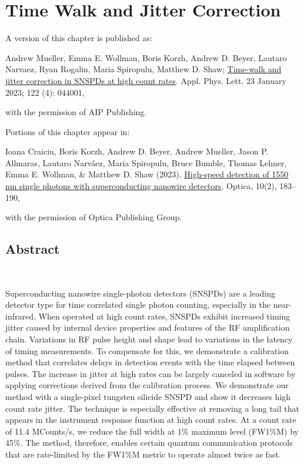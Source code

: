 \documentclass[11pt]{caltech_thesis} %
\begin{document}
\hypertarget{time-walk-and-jitter-correction}{%
\chapter{Time Walk and Jitter Correction}\label{time-walk-and-jitter-correction}}

A version of this chapter is published as:

Andrew Mueller, Emma E. Wollman, Boris Korzh, Andrew D. Beyer, Lautaro Narvaez, Ryan Rogalin, Maria Spiropulu, Matthew D. Shaw; \href{https://pubs.aip.org/aip/apl/article/122/4/044001/2870246/Time-walk-and-jitter-correction-in-SNSPDs-at-high}{Time-walk and jitter correction in SNSPDs at high count rates}. Appl. Phys. Lett. 23 January 2023; 122 (4): 044001,

with the permission of AIP Publishing.

Portions of this chapter appear in:

Ioana Craiciu, Boris Korzh, Andrew D. Beyer, Andrew Mueller, Jason P. Allmaras, Lautaro Narváez, Maria Spiropulu, Bruce Bumble, Thomas Lehner, Emma E. Wollman, \& Matthew D. Shaw (2023). \href{https://opg.optica.org/optica/fulltext.cfm?uri=optica-10-2-183\&id=525546}{High-speed detection of 1550 nm single photons with superconducting nanowire detectors}. Optica, 10(2), 183--190,

with the permission of Optica Publishing Group.

\hypertarget{abstract-1}{%
\section{Abstract}\label{abstract-1}}

~~~~~

Superconducting nanowire single-photon detectors (SNSPDs) are a leading detector type for time correlated single photon counting, especially in the near-infrared. When operated at high count rates, SNSPDs exhibit increased timing jitter caused by internal device properties and features of the RF amplification chain. Variations in RF pulse height and shape lead to variations in the latency of timing measurements. To compensate for this, we demonstrate a calibration method that correlates delays in detection events with the time elapsed between pulses. The increase in jitter at high rates can be largely canceled in software by applying corrections derived from the calibration process. We demonstrate our method with a single-pixel tungsten silicide SNSPD and show it decreases high count rate jitter. The technique is especially effective at removing a long tail that appears in the instrument response function at high count rates. At a count rate of 11.4 MCounts/s, we reduce the full width at 1\% maximum level (FW1\%M) by 45\%. The method, therefore, enables certain quantum communication protocols that are rate-limited by the FW1\%M metric to operate almost twice as fast.
\end{document}
